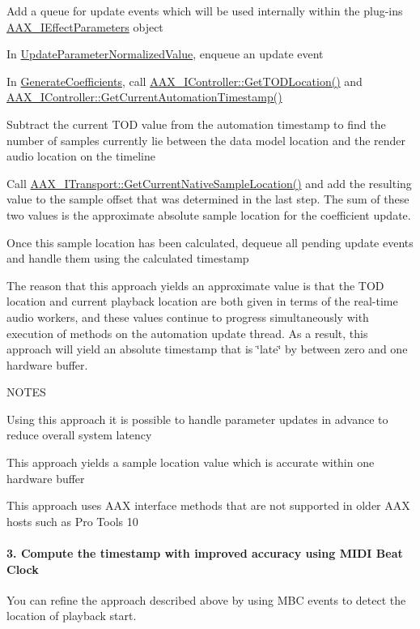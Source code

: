 \begin{DoxyEnumerate}
\item Add a queue for update events which will be used internally within the plug-\/in\textquotesingle{}s \mbox{\hyperlink{a01825}{A\+A\+X\+\_\+\+I\+Effect\+Parameters}} object  
\item In \mbox{\hyperlink{a01669_a685858711efb8634ce66c327f2865c71}{Update\+Parameter\+Normalized\+Value}}, enqueue an update event  
\item In \mbox{\hyperlink{a01669_a083265b008921b6114ede387711694b7}{Generate\+Coefficients}}, call \mbox{\hyperlink{a01789_afbc2973d755b6c3ae82b6c8461e9fdee}{A\+A\+X\+\_\+\+I\+Controller\+::\+Get\+T\+O\+D\+Location()}} and \mbox{\hyperlink{a01789_af9ab9b228023e116f89249a56c27a20f}{A\+A\+X\+\_\+\+I\+Controller\+::\+Get\+Current\+Automation\+Timestamp()}}  
\item Subtract the current T\+OD value from the automation timestamp to find the number of samples currently lie between the data model location and the render audio location on the timeline  
\item Call \mbox{\hyperlink{a01885_a8119233b03774528ffaa519771d792a0}{A\+A\+X\+\_\+\+I\+Transport\+::\+Get\+Current\+Native\+Sample\+Location()}} and add the resulting value to the sample offset that was determined in the last step. The sum of these two values is the approximate absolute sample location for the coefficient update.  
\item Once this sample location has been calculated, dequeue all pending update events and handle them using the calculated timestamp  
\end{DoxyEnumerate}

The reason that this approach yields an approximate value is that the T\+OD location and current playback location are both given in terms of the real-\/time audio workers, and these values continue to progress simultaneously with execution of methods on the automation update thread. As a result, this approach will yield an absolute timestamp that is \char`\"{}late\char`\"{} by between zero and one hardware buffer.

N\+O\+T\+ES \begin{DoxyItemize}
\item Using this approach it is possible to handle parameter updates in advance to reduce overall system latency \item This approach yields a sample location value which is accurate within one hardware buffer \item This approach uses A\+AX interface methods that are not supported in older A\+AX hosts such as Pro Tools 10\end{DoxyItemize}
\hypertarget{a00821_parameterUpdateTiming_determiningTimelinePosition_3}{}\paragraph{3. Compute the timestamp with improved accuracy using M\+I\+D\+I Beat Clock}\label{a00821_parameterUpdateTiming_determiningTimelinePosition_3}
You can refine the approach described above by using M\+BC events to detect the location of playback start.


